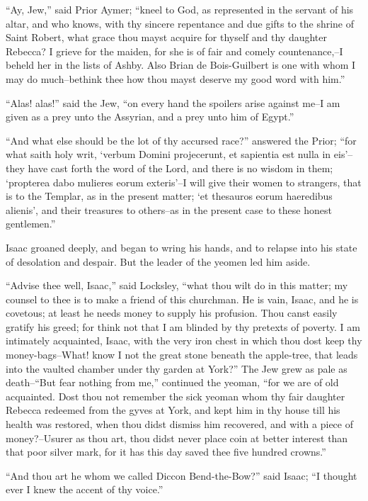``Ay, Jew,'' said Prior Aymer; ``kneel to God, as represented in the
servant of his altar, and who knows, with thy sincere repentance and due
gifts to the shrine of Saint Robert, what grace thou mayst acquire for
thyself and thy daughter Rebecca? I grieve for the maiden, for she is of
fair and comely countenance,--I beheld her in the lists of Ashby. Also
Brian de Bois-Guilbert is one with whom I may do much--bethink thee how
thou mayst deserve my good word with him.''

``Alas! alas!'' said the Jew, ``on every hand the spoilers arise against
me--I am given as a prey unto the Assyrian, and a prey unto him of
Egypt.''

``And what else should be the lot of thy accursed race?'' answered the
Prior; ``for what saith holy writ, `verbum Domini projecerunt, et
sapientia est nulla in eis'--they have cast forth the word of the Lord,
and there is no wisdom in them; `propterea dabo mulieres eorum
exteris'--I will give their women to strangers, that is to the Templar,
as in the present matter; `et thesauros eorum haeredibus alienis', and
their treasures to others--as in the present case to these honest
gentlemen.''

Isaac groaned deeply, and began to wring his hands, and to relapse into
his state of desolation and despair. But the leader of the yeomen led
him aside.

``Advise thee well, Isaac,'' said Locksley, ``what thou wilt do in this
matter; my counsel to thee is to make a friend of this churchman. He is
vain, Isaac, and he is covetous; at least he needs money to supply his
profusion. Thou canst easily gratify his greed; for think not that I am
blinded by thy pretexts of poverty. I am intimately acquainted, Isaac,
with the very iron chest in which thou dost keep thy money-bags--What!
know I not the great stone beneath the apple-tree, that leads into the
vaulted chamber under thy garden at York?'' The Jew grew as pale as
death--``But fear nothing from me,'' continued the yeoman, ``for we are
of old acquainted. Dost thou not remember the sick yeoman whom thy fair
daughter Rebecca redeemed from the gyves at York, and kept him in thy
house till his health was restored, when thou didst dismiss him
recovered, and with a piece of money?--Usurer as thou art, thou didst
never place coin at better interest than that poor silver mark, for it
has this day saved thee five hundred crowns.''

``And thou art he whom we called Diccon Bend-the-Bow?'' said Isaac; ``I
thought ever I knew the accent of thy voice.''

